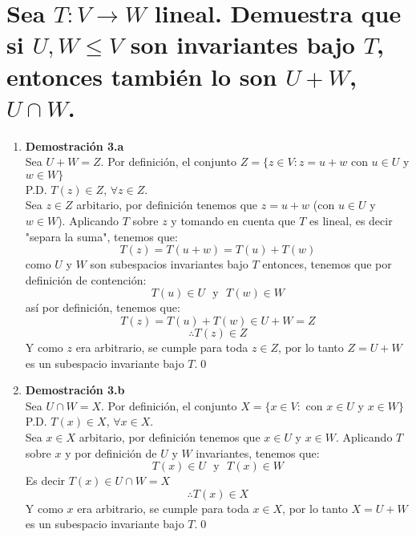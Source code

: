 \section{Sea $T:V\longrightarrow W$ lineal. Demuestra que si $U,W \leq V$
son invariantes bajo $T$, entonces también lo son $U+W$, $U\cap W$.}

\begin{enumerate}

\item \textbf{ Demostración 3.a}\\ Sea $U+W =Z$. Por definición, el conjunto $Z=\{z\in V : z= u+w$   con $u\in U$ y $w\in W\}$\\ P.D. $T(z)\in Z$, $\forall z\in Z$.\\
Sea $z\in Z$ arbitario, por definición tenemos que $z= u+w$ (con $u\in U$ y $w\in W$). Aplicando $T$ sobre $z$ y tomando en cuenta que $T$ es lineal, es decir "separa la suma", tenemos que:
\[T(z) = T(u+w) = T(u)+ T(w)\] como $U$ y $W$ son subespacios invariantes bajo $T$ entonces, tenemos que por definici\'on de contenci\'on: \[T(u) \in U~~~\text{y}~~~  T(w)\in W\]así por definici\'on, tenemos que: \[ T(z)=T(u)+T(w) \in U + W = Z\] \[\therefore T(z) \in Z\]  Y como $z$ era arbitrario, se cumple para toda $z\in Z$, por lo tanto $Z=U+W$ es un subespacio invariante bajo $T$.\qed

\item\textbf{ Demostración 3.b}
\\ Sea $U\cap W =X$. Por definición, el conjunto $X=\{x\in V :$   con $x\in U$ y $x\in W\}$\\ 

P.D. $T(x)\in X$, $\forall x\in X$.\\

Sea $x\in X$ arbitario, por definición tenemos que $x\in U$ y $x\in W$. Aplicando $T$ sobre $x$ y por definici\'on de $U$ y $W$ invariantes, tenemos que: \[T(x) \in U~~~\text{y}~~~  T(x)\in W\]
Es decir $T(x)\in U\cap W =X $
\[\therefore T(x)\in X\] Y como $x$ era arbitrario, se cumple para toda $x\in X$, por lo tanto $X=U+W$ es un subespacio invariante bajo $T$.\qed
\end{enumerate}